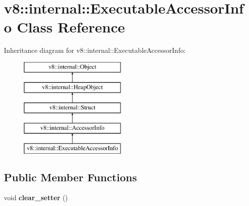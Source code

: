 \hypertarget{classv8_1_1internal_1_1_executable_accessor_info}{}\section{v8\+:\+:internal\+:\+:Executable\+Accessor\+Info Class Reference}
\label{classv8_1_1internal_1_1_executable_accessor_info}
Inheritance diagram for v8\+:\+:internal\+:\+:Executable\+Accessor\+Info\+:\begin{figure}[H]
\begin{center}
\leavevmode
\includegraphics[height=5.000000cm]{classv8_1_1internal_1_1_executable_accessor_info}
\end{center}
\end{figure}
\subsection*{Public Member Functions}
\begin{DoxyCompactItemize}
\item 
\hypertarget{classv8_1_1internal_1_1_executable_accessor_info_a2947509dc06e8fcc9dc06f64fd5d621f}{}void {\bfseries clear\+\_\+setter} ()\label{classv8_1_1internal_1_1_executable_accessor_info_a2947509dc06e8fcc9dc06f64fd5d621f}

\end{DoxyCompactItemize}
